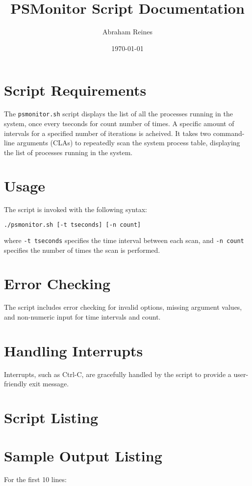 \documentclass{article}
\title{PSMonitor Script Documentation}
\author{Abraham Reines}
\date{\today}
\begin{document}
\maketitle

\section{Script Requirements}
The \texttt{psmonitor.sh} script displays the list of all the processes running in the system, once every tseconds for count number of times. A specific amount of intervals for a specified number of iterations is acheived. It takes two command-line arguments (CLAs) to repeatedly scan the system process table, displaying the list of processes running in the system.

\section{Usage}
The script is invoked with the following syntax:
\begin{lstlisting}[language=bash]
./psmonitor.sh [-t tseconds] [-n count]
\end{lstlisting}
where \texttt{-t tseconds} specifies the time interval between each scan, and \texttt{-n count} specifies the number of times the scan is performed.

\section{Error Checking}
The script includes error checking for invalid options, missing argument values, and non-numeric input for time intervals and count.

\section{Handling Interrupts}
Interrupts, such as Ctrl-C, are gracefully handled by the script to provide a user-friendly exit message.

\section{Script Listing}


\newpage
\section{Sample Output Listing}
For the first 10 lines:

\end{document}
